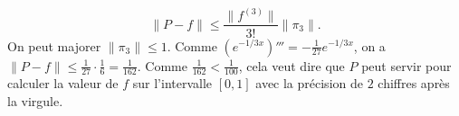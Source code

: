 \documentclass{article}
\author{Frederic Becerril}
\begin{document}
$$ \| P - f \| \leq \frac{ \| f^{ (3) } \| }{ 3! } \| \pi_3 \|. $$ On peut majorer $ \| \pi_3 \| \leq 1 $. Comme $ \left( e^{ -1/3 x } \right)''' = - \frac{ 1 }{ 27 } e^{ -1/3 x } $, on a $ \| P - f \| \leq \frac{ 1 }{ 27 } \cdot \frac{ 1 }{ 6 } = \frac{ 1 }{ 162 } $. Comme $ \frac{ 1 }{ 162 } < \frac{ 1 }{ 100 } $, cela veut dire que $ P $ peut servir pour calculer la valeur de $ f $ sur l'intervalle $ [ 0, 1 ] $ avec la précision de $ 2 $ chiffres après la virgule.
\end{document}

